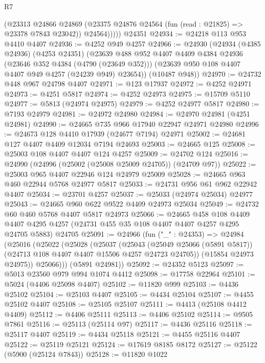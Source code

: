 \begin{lexlean}{R7}
\begin{coremodule}
            (@23313
              @24866
              @24869
              (@23375 @24876 @24564 (fun (read : @21825) => @23378 @7843 @23042))
              @24564)))))
    @24351
@24934 := @24218 @113 @953 @4410 @4407
@24936 := @4252 @949 @4257
@24966 := @24930
    (@24934
      (@4385 @24936)
      (@4253 @24351)
      (@23639
        @488
        @952
        @4407
        @4409
        @4384
        @24936
        (@23646 @352 @4384 (@4790 (@23649 @352)))
        (@23639 @950 @108 @4407 @4407 @949 @4257 (@24239 @949) @23654))
      (@10487 @948))
@24970 := @24732 @448 @967 @24798 @4407
@24971 := @123 @17937
@24972 := @4252 @24971
@24973 := @4251 @5817
@24974 := @4252 @24973
@24975 := @15709 @5110
@24977 := @5813 (@24974 @24975)
@24979 := @4252 @24977 @5817
@24980 := @7193 @24979
@24981 := @24972 @24980
@24984 := @24970 @24981 (@4251 @24981)
@24990 := @24665 @735 @966 @17940 @22947 @24971 @24980
@24996 := @24673 @128 @4410 @17939 (@24677 @7194) @24971
@25002 := @24681 @127 @4407 @4409 @12034 @7194 @24693
@25003 := @24665 @125
@25008 := @25003 @108 @4407 @4407 @124 @4257
@25009 := @24702 @124
@25016 := @24990 (@24996 (@25002 (@25008 @25009 @24705)) (@24709 @97))
@25022 := @25003 @965 @4407 @22946 @124 @24979 @25009
@25028 := @24665 @963 @460 @22944 @5768 @24977 @5817
@25033 := @24731 @956 @61 @962 @22942 @4407
@25034 := @23701 @4257
@25037 := @25033 (@24974 @25034) @24977
@25043 := @24665 @960 @622 @9522 @4409 @24973 @25034
@25049 := @24732 @60 @460 @5768 @4407 @5817 @24973
@25066 := @24665
    @458
    @108
    @4409
    @4407
    @4295
    @4257
    (@24731 @455 @35 @108 @4407 @4407 @4257 @4295 @24705 @5883)
    @24705
@25091 := @24966
    (fun ("_" : @24353) =>
    @24984
      (@25016
        (@25022
          (@25028
            (@25037
              (@25043
                (@25049 @25066 (@5891 @5817))
                (@24713 @108 @4407 @4407 @15506 @4257 @24723 @24705))
              (@15854 @24973 @24975))
            @25066)))
      (@5891 @24981))
@25092 := @24352 @5123
@25097 := @5013 @23560 @979 @994 @1074 @4412
@25098 := @17758 @22964
@25101 := @5024 (@4406 @25098 @4407)
@25102 := @11820 @999
@25103 := @4436 @25102
@25104 := @25103 @4407
@25105 := @4434 @25104
@25107 := @4455 @25102 @4407
@25108 := @25105 @25107
@25111 := @4413 (@25108 @4412 @4409)
@25112 := @4406 @25111
@25113 := @4406 @25102
@25114 := @9505 @7861
@25116 := @25113 (@25114 @97)
@25117 := @4436 @25116
@25118 := @25117 @4407
@25119 := @4434 @25118
@25121 := @4455 @25116 @4407
@25122 := @25119 @25121
@25124 := @17619 @8185 @8172
@25127 := @25122 (@5900 (@25124 @7843))
@25128 := @11820 @1022

\end{coremodule}
\end{lexlean}
